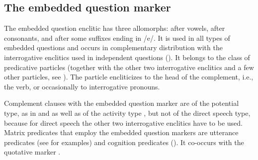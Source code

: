 
\subsection{The embedded question marker}
\label{ssec:The embedded question marker}

The embedded question enclitic has three allomorphs:  after vowels,  after consonants, and  after some suffixes ending in /e/. It is used in all types of embedded questions and occurs in complementary distribution with the interrogative enclitics used in independent questions (). It belongs to the class of predicative particles (together with the other two interrogative enclitics and a few other particles, see ). The particle encliticizes to the head of the complement, i.e., the verb, or occasionally to interrogative pronouns. 

Complement clauses with the embedded question marker are of the potential type, as in  and  as well as of the activity type , but not of the direct speech type, because for direct speech the other two interrogative enclitics have to be used. Matrix predicates that employ the embedded question markers are utterance predicates (see  for examples) and cognition predicates (). It co-occurs with the quotative marker .

